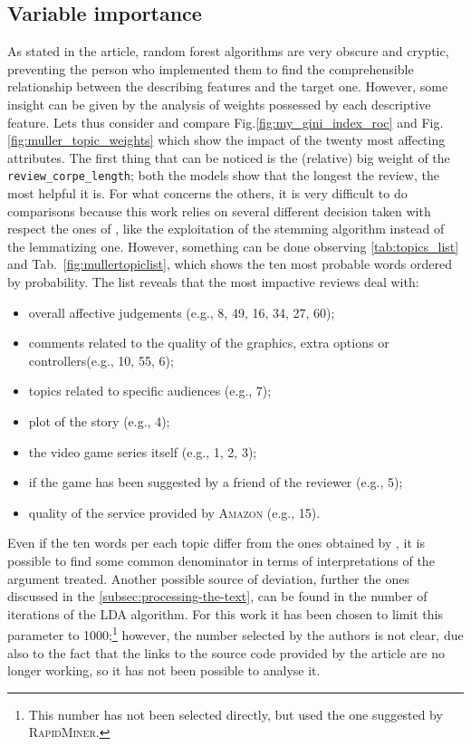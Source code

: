 \documentclass[a4paper]{article}
\begin{document}
		\subsection{Variable importance}
			As stated in the article, random forest algorithms are very obscure and cryptic, preventing the person who implemented them to find the comprehensible relationship between the describing features and the target one. However, some insight can be given by the analysis of weights possessed by each descriptive feature. Lets thus consider and compare Fig.\autoref{fig:my_gini_index_roc} and Fig.\autoref{fig:muller_topic_weights} which show the impact of the twenty most affecting attributes. The first thing that can be noticed is the (relative) big weight of the \verb*|review_corpe_length|; both the models show that the longest the review, the most helpful it is. For what concerns the others, it is very difficult to do comparisons because this work relies on several different decision taken with respect the ones of \cite{article:muller}, like the exploitation of the stemming algorithm instead of the lemmatizing one. However, something can be done observing \autoref{tab:topics_list} and Tab.~\ref{fig:mullertopiclist}, which shows the ten most probable words ordered by probability. The list reveals that the most impactive reviews deal with:
			\begin{itemize}
				\item overall affective judgements (e.g., 8, 49, 16, 34, 27, 60);
				\item comments related to the quality of the graphics, extra options or controllers(e.g., 10, 55, 6);
				\item topics related to specific audiences (e.g., 7);
				\item plot of the story (e.g., 4);
				\item the video game series itself (e.g., 1, 2, 3);
				\item if the game has been suggested by a friend of the reviewer (e.g., 5);
				\item quality of the service provided by \textsc{Amazon} (e.g., 15).
			\end{itemize}
		
			Even if the ten words per each topic differ from the ones obtained by \autocite{article:muller}, it is possible to find some common denominator in terms of interpretations of the argument treated. Another possible source of deviation, further the ones discussed in the \autoref{subsec:processing-the-text}, can be found in the number of iterations of the LDA algorithm. For this work it has been chosen to limit this parameter to 1000;\footnote{This number has not been selected directly, but used the one suggested by \textsc{RapidMiner}.} however, the number selected by the authors is not clear, due also to the fact that the links to the source code provided by the article are no longer working, so it has not been possible to analyse it.
			
\end{document}

